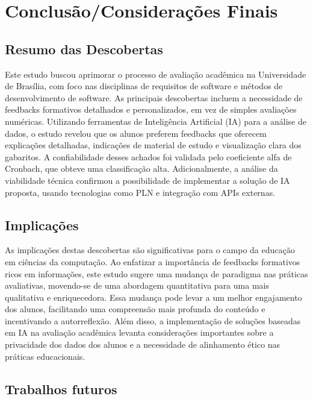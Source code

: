 \chapter{Conclusão/Considerações Finais}

\section{Resumo das Descobertas}

Este estudo buscou aprimorar o processo de avaliação acadêmica na Universidade de Brasília, com foco nas disciplinas de requisitos de software e métodos de desenvolvimento de software. As principais descobertas incluem a necessidade de feedbacks formativos detalhados e personalizados, em vez de simples avaliações numéricas. Utilizando ferramentas de Inteligência Artificial (IA) para a análise de dados, o estudo revelou que os alunos preferem feedbacks que oferecem explicações detalhadas, indicações de material de estudo e visualização clara dos gabaritos. A confiabilidade desses achados foi validada pelo coeficiente alfa de Cronbach, que obteve uma classificação alta. Adicionalmente, a análise da viabilidade técnica confirmou a possibilidade de implementar a solução de IA proposta, usando tecnologias como PLN e integração com APIs externas.

\section{Implicações}

As implicações destas descobertas são significativas para o campo da educação em ciências da computação. Ao enfatizar a importância de feedbacks formativos ricos em informações, este estudo sugere uma mudança de paradigma nas práticas avaliativas, movendo-se de uma abordagem quantitativa para uma mais qualitativa e enriquecedora. Essa mudança pode levar a um melhor engajamento dos alunos, facilitando uma compreensão mais profunda do conteúdo e incentivando a autorreflexão. Além disso, a implementação de soluções baseadas em IA na avaliação acadêmica levanta considerações importantes sobre a privacidade dos dados dos alunos e a necessidade de alinhamento ético nas práticas educacionais.

\section{Trabalhos futuros}

